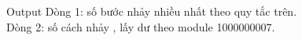 Output
Dòng 1: số bước nhảy nhiều nhất theo quy tắc trên.   
\\   Dòng 2: số cách nhảy , lấy dư theo module 1000000007.
